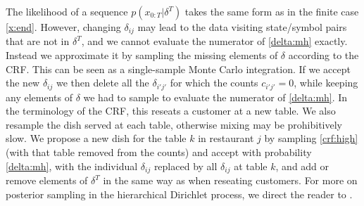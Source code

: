 {The likelihood of a sequence $p(x_{0:T}|\delta^T)$ takes the same form as in the finite case \eqref{x:end}.  However, changing $\delta_{ij}$ may lead to the data visiting state/symbol pairs that are not in $\delta^T$, and we cannot evaluate the numerator of \eqref{delta:mh} exactly.  Instead we approximate it by sampling the missing elements of $\delta$ according to the CRF.  This can be seen as a single-sample Monte Carlo integration.  If we accept the new $\delta_{ij}$ we then delete all the $\delta_{i'j'}$ for which the counts $c_{i'j'} = 0$, while keeping any elements of $\delta$ we had to sample to evaluate the numerator of \eqref{delta:mh}.  In the terminology of the CRF, this reseats a customer at a new table.  We also resample the dish served at each table, otherwise mixing may be prohibitively slow.  We propose a new dish for the table $k$ in restaurant $j$ by sampling \eqref{crf:high} (with that table removed from the counts) and accept with probability \eqref{delta:mh}, with the individual $\delta_{ij}$ replaced by all $\delta_{ij}$ at table $k$, and add or remove elements of $\delta^T$ in the same way as when reseating customers.  For more on posterior sampling in the hierarchical Dirichlet process, we direct the reader to \cite{Teh2006}.
  }

 
 
 
 
